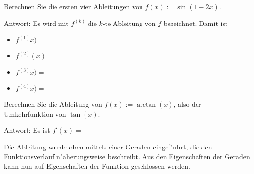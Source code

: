\begin{MExercises}
\begin{MExercise}
Berechnen Sie die ersten vier Ableitungen von $f(x) := \sin(1 - 2x)$.

Antwort: 
Es wird mit $f^{(k)}$ die $k$-te Ableitung von $f$ bezeichnet.
Damit ist
\begin{itemize}
\item
 $f^{(1)}x) = $
\item
 $f^{(2)}(x) = $
\item
 $f^{(3)}x) = $
\item
 $f^{(4)}x) = $
\end{itemize}
\end{MExercise}

\begin{MExercise}
Berechnen Sie die Ableitung von $f(x) := \arctan(x)$, also  der Umkehrfunktion 
von $\tan(x)$.

Antwort: Es ist
 $f'(x) = $
\end{MExercise}

\end{MExercises}




\begin{MIntro}
Die Ableitung wurde oben mittels einer Geraden eingef"uhrt, die den 
Funktionsverlauf {\glqq}n"aherungsweise{\grqq} beschreibt. Aus den 
Eigenschaften der Geraden kann nun auf Eigenschaften der Funktion 
geschlossen werden.
\end{MIntro}

 


